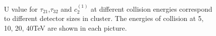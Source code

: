 \begin{figure}
\begin{center}
\end{center}
\caption{U value for $\tau_{21}$,$\tau_{32}$ and $c_2^{(1)}$ at different collision energies correspond to different detector sizes in cluster. The energies of collision at 5, 10, 20, 40TeV are shown in each picture.}
\label{fig:cluster_U_summary}
\end{figure}


